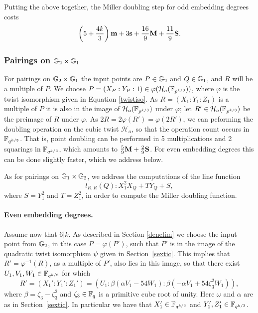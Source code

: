 Putting the above together, the Miller doubling step 
for odd embedding degrees costs
\begin{align*}
\left(5 + \frac{4k}{3}\right)\textbf{m}
+ 3\textbf{s}
+ \frac{16}{9}\textbf{M}
+ \frac{11}{9}\textbf{S}.
\end{align*}

\subsubsection{Pairings on $\mathbb{G}_{2} \times \mathbb{G}_{1}$}

For pairings on $\mathbb{G}_{2} \times \mathbb{G}_{1}$ the input points are
$P \in \mathbb{G}_{2}$ and $Q \in \mathbb{G}_{1}$, and
$R$ will be a multiple of $P$.
We choose $P = (X_P:Y_P:1) \in \varphi(\mathcal{H}_a(\mathbb{F}_{p^{k/3}}))$, where $\varphi$
is the twist isomorphism given in Equation \eqref{twistiso}.
As $R=(X_1 : Y_1 : Z_1)$ is a multiple of $P$ it is also in the image of $\mathcal{H}_a(\mathbb{F}_{p^{k/3}})$ under $\varphi$; 
let $R' \in \mathcal{H}_a(\mathbb{F}_{p^{k/3}})$ be the preimage of $R$ under $\varphi$.
As $2R = 2\varphi(R') = \varphi(2R')$, 
we can peforming the doubling operation on the cubic twist $\mathcal{H}_a$, 
so that the operation count occurs in $\mathbb{F}_{q^{k/3}}$.
That is, point doubling can be performed in 5 multiplications and 2 squarings in $\mathbb{F}_{q^{k/3}}$, which amounts to $\frac{5}{9}\textbf{M} + \frac{2}{9}\textbf{S}$.
For even embedding degrees this can be done slightly faster, which we address below.

As for pairings on $\mathbb{G}_{1} \times \mathbb{G}_{2}$, 
we address the computations of the line function 
\begin{equation}\label{l2R}
l_{R,R}(Q): X_1^2 X_Q + T Y_Q + S,
\end{equation}
where $S = Y_1^2$ and $T = Z_1^2$,
in order to compute the Miller doubling function.

\paragraph*{Even embedding degrees.}

Assume now that $6|k$. 
As described in Section \ref{denelim}
we choose the input point from $\mathbb{G}_{2}$, 
in this case $P = \varphi(P')$, such that $P'$ is
in the image of the quadratic twist isomorphism $\psi$ given in 
Section~\ref{sextic}. 
This implies that $R' = \varphi^{-1}(R)$, 
as a multiple of $P'$, also lies in this image, 
so that there exist $U_1, V_1, W_1 \in \mathbb{F}_{q^{k/6}}$ for which
\begin{equation}\label{Rprime}
R' = (X_1':Y_1':Z_1') = (U_1:\beta(\alpha V_1 - 54W_1) : \beta(-\alpha V_1 + 54\zeta_3^2 W_1)),
\end{equation}
where $\beta = \zeta_3-\zeta_3^2$ and 
$\zeta_3 \in \mathbb{F}_{q}$ is a primitive cube root of unity.
Here $\omega$ and $\alpha$ are as in Section~\ref{sextic}.
In particular we have that $X_1' \in \mathbb{F}_{q^{k/6}}$ and
$Y_1',Z_1' \in \mathbb{F}_{q^{k/3}}$.

